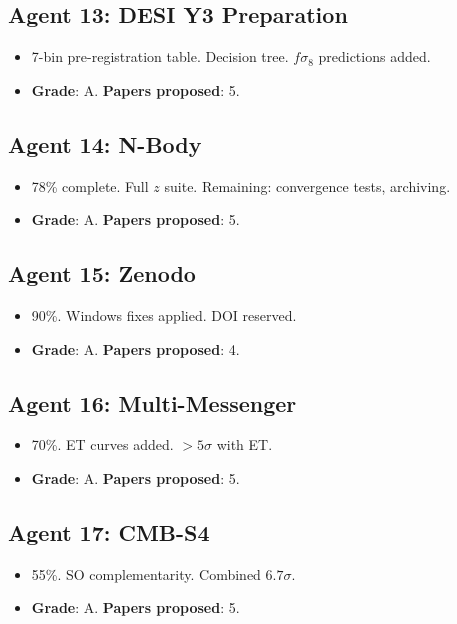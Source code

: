 \documentclass[11pt,a4paper]{article}
\begin{document}
\subsection{Agent 13: DESI Y3 Preparation}
\begin{itemize}[nosep]
\item 7-bin pre-registration table. Decision tree. $f\sigma_8$ predictions added.
\item \textbf{Grade}: A. \textbf{Papers proposed}: 5.
\end{itemize}

\subsection{Agent 14: N-Body}
\begin{itemize}[nosep]
\item 78\% complete. Full $z$ suite. Remaining: convergence tests, archiving.
\item \textbf{Grade}: A. \textbf{Papers proposed}: 5.
\end{itemize}

\subsection{Agent 15: Zenodo}
\begin{itemize}[nosep]
\item 90\%. Windows fixes applied. DOI reserved.
\item \textbf{Grade}: A. \textbf{Papers proposed}: 4.
\end{itemize}

\subsection{Agent 16: Multi-Messenger}
\begin{itemize}[nosep]
\item 70\%. ET curves added. $> 5\sigma$ with ET.
\item \textbf{Grade}: A. \textbf{Papers proposed}: 5.
\end{itemize}

\subsection{Agent 17: CMB-S4}
\begin{itemize}[nosep]
\item 55\%. SO complementarity. Combined $6.7\sigma$.
\item \textbf{Grade}: A. \textbf{Papers proposed}: 5.
\end{itemize}
\end{document}
